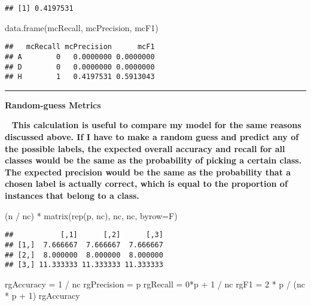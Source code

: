 \documentclass[
]{article}
\newenvironment{Shaded}{\begin{snugshade}}{\end{snugshade}}
\newcommand{\AttributeTok}[1]{\textcolor[rgb]{0.77,0.63,0.00}{#1}}
\newcommand{\DecValTok}[1]{\textcolor[rgb]{0.00,0.00,0.81}{#1}}
\newcommand{\FunctionTok}[1]{\textcolor[rgb]{0.00,0.00,0.00}{#1}}
\newcommand{\NormalTok}[1]{#1}
\newcommand{\OtherTok}[1]{\textcolor[rgb]{0.56,0.35,0.01}{#1}}
\newcommand{\SpecialCharTok}[1]{\textcolor[rgb]{0.00,0.00,0.00}{#1}}
\begin{document}
\begin{verbatim}
## [1] 0.4197531
\end{verbatim}

\begin{Shaded}
\begin{Highlighting}[]
\FunctionTok{data.frame}\NormalTok{(mcRecall, mcPrecision, mcF1)}
\end{Highlighting}
\end{Shaded}

\begin{verbatim}
##   mcRecall mcPrecision      mcF1
## A        0   0.0000000 0.0000000
## D        0   0.0000000 0.0000000
## H        1   0.4197531 0.5913043
\end{verbatim}

\begin{center}\rule{0.5\linewidth}{0.5pt}\end{center}

\textbf{Random-guess Metrics}

~ \textbf{This calculation is useful to compare my model for the same
reasons discussed above. If I have to make a random guess and predict
any of the possible labels, the expected overall accuracy and recall for
all classes would be the same as the probability of picking a certain
class. The expected precision would be the same as the probability that
a chosen label is actually correct, which is equal to the proportion of
instances that belong to a class.}

\begin{Shaded}
\begin{Highlighting}[]
\NormalTok{(n }\SpecialCharTok{/}\NormalTok{ nc) }\SpecialCharTok{*} \FunctionTok{matrix}\NormalTok{(}\FunctionTok{rep}\NormalTok{(p, nc), nc, nc, }\AttributeTok{byrow=}\NormalTok{F)}
\end{Highlighting}
\end{Shaded}

\begin{verbatim}
##           [,1]      [,2]      [,3]
## [1,]  7.666667  7.666667  7.666667
## [2,]  8.000000  8.000000  8.000000
## [3,] 11.333333 11.333333 11.333333
\end{verbatim}

\begin{Shaded}
\begin{Highlighting}[]
\NormalTok{rgAccuracy }\OtherTok{=} \DecValTok{1} \SpecialCharTok{/}\NormalTok{ nc}
\NormalTok{  rgPrecision }\OtherTok{=}\NormalTok{ p}
\NormalTok{  rgRecall }\OtherTok{=} \DecValTok{0}\SpecialCharTok{*}\NormalTok{p }\SpecialCharTok{+} \DecValTok{1} \SpecialCharTok{/}\NormalTok{ nc}
\NormalTok{  rgF1 }\OtherTok{=} \DecValTok{2} \SpecialCharTok{*}\NormalTok{ p }\SpecialCharTok{/}\NormalTok{ (nc }\SpecialCharTok{*}\NormalTok{ p }\SpecialCharTok{+} \DecValTok{1}\NormalTok{)}
\NormalTok{rgAccuracy}
\end{Highlighting}
\end{Shaded}
\end{document}
